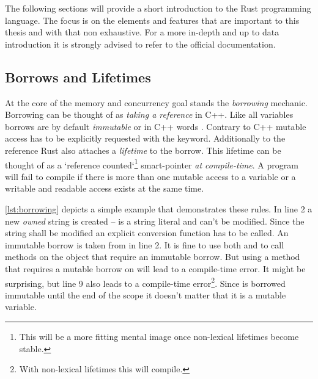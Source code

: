 \documentclass[thesis]{subfiles}
\begin{document}
  The following sections will provide a short introduction to the Rust programming language.
  The focus is on the elements and features that are important to this thesis and with that non exhaustive.
  For a more in-depth and up to data introduction it is strongly advised to refer to the official documentation.

  \subsection{Borrows and Lifetimes}\label{ssec:rustBorr}
    At the core of the memory and concurrency goal stands the \emph{borrowing} mechanic.
    Borrowing can be thought of as \emph{taking a reference} in C++.
    Like all variables borrows are by default \emph{immutable} or in C++ words .
    Contrary to C++ mutable access has to be explicitly requested with the  keyword.
    Additionally to the reference Rust also attaches a \emph{lifetime} to the borrow.
    This lifetime can be thought of as a `reference counted`\footnote{%
      This will be a more fitting mental image once non-lexical lifetimes become stable.
    } smart-pointer \emph{at compile-time}.
    A program will fail to compile if there is more than one mutable access to a variable or a writable and readable access exists at the same time.

    

    \autoref{lst:borrowing} depicts a simple example that demonstrates these rules.
    In line 2 a new \emph{owned} string is created --  is a string literal and can't be modified.
    Since the string shall be modified an explicit conversion function has to be called.
    An immutable borrow is taken from  in line 2.
    It is fine to use both  and  to call methods on the object that require an immutable borrow.
    But using a method that requires a mutable borrow on  will lead to a compile-time error.
    It might be surprising, but line 9 also leads to a compile-time error\footnote{%
      With non-lexical lifetimes this will compile.
    }.
    Since  is borrowed immutable until the end of the scope it doesn't matter that it is a mutable variable.

    \newsavebox{\lifetimeErrBox}
    \begin{lrbox}{\lifetimeErrBox}%
      \begin{minipage}{.45\linewidth}
        
      \end{minipage}
    \end{lrbox}
\end{document}
